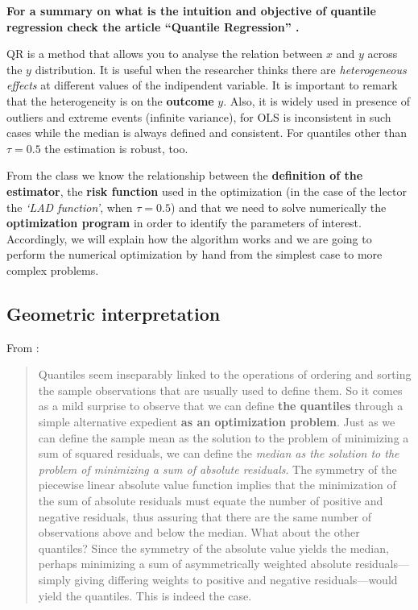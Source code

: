 \documentclass[]{book}
\begin{document}
\textbf{For a summary on what is the intuition and objective of quantile
regression check the article ``Quantile Regression''
\citep{koenker2001quantile}.}

QR is a method that allows you to analyse the relation between \(x\) and
\(y\) across the \(y\) distribution. It is useful when the researcher
thinks there are \emph{heterogeneous effects} at different values of the
indipendent variable. It is important to remark that the heterogeneity
is on the \textbf{outcome} \(y\). Also, it is widely used in presence of
outliers and extreme events (infinite variance), for OLS is inconsistent
in such cases while the median is always defined and consistent. For
quantiles other than \(\tau = 0.5\) the estimation is robust, too.

From the class we know the relationship between the \textbf{definition
of the estimator}, the \textbf{risk function} used in the optimization
(in the case of the lector the \emph{`LAD function'}, when
\(\tau = 0.5\)) and that we need to solve numerically the
\textbf{optimization program} in order to identify the parameters of
interest. Accordingly, we will explain how the algorithm works and we
are going to perform the numerical optimization by hand from the
simplest case to more complex problems.

\subsection{Geometric interpretation}\label{geometric-interpretation}

From \citep{koenker2001quantile}:

\begin{quote}
Quantiles seem inseparably linked to the operations of ordering and
sorting the sample observations that are usually used to define them. So
it comes as a mild surprise to observe that we can define \textbf{the
quantiles} through a simple alternative expedient \textbf{as an
optimization problem}. Just as we can define the sample mean as the
solution to the problem of minimizing a sum of squared residuals, we can
define the \emph{median as the solution to the problem of minimizing a
sum of absolute residuals}. The symmetry of the piecewise linear
absolute value function implies that the minimization of the sum of
absolute residuals must equate the number of positive and negative
residuals, thus assuring that there are the same number of observations
above and below the median. What about the other quantiles? Since the
symmetry of the absolute value yields the median, perhaps minimizing a
sum of asymmetrically weighted absolute residuals---simply giving
differing weights to positive and negative residuals---would yield the
quantiles. This is indeed the case.
\end{quote}
\end{document}
